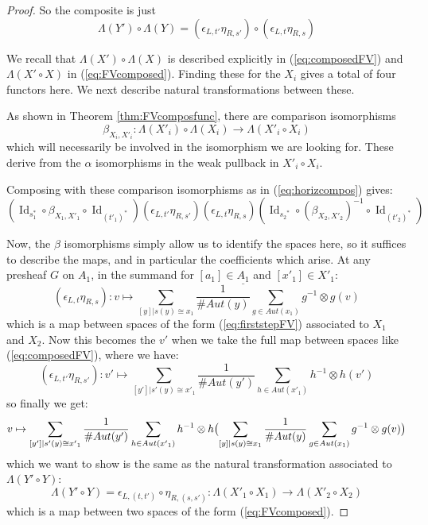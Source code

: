 \documentclass[10pt]{amsart}
\numberwithin{theorem}{subsection}
\newcommand{\ra}{\mathop{\rightarrow}}
\newcommand{\opname}[1]{\operatorname{#1}}
\newcommand{\Id}{\opname{Id}}
\newcommand{\FV}{\Lambda}
\begin{document}
\begin{proof}
So the composite is just
\begin{equation}
\FV(Y') \circ \FV(Y) = (\epsilon_{L,t'} \eta_{R,s'})\circ (\epsilon_{L,t} \eta_{R,s})
\end{equation}

We recall that $\FV(X') \circ \FV(X)$ is described explicitly in
(\ref{eq:composedFV}) and $\FV(X' \circ X)$ in (\ref{eq:FVcomposed}).
Finding these for the $X_i$ gives a total of four functors here.  We
next describe natural transformations between these.

As shown in Theorem \ref{thm:FVcomposfunc}, there are comparison
isomorphisms
\begin{equation}
\beta_{X_i,{X'}_i} : \FV({X'}_i) \circ \FV(X_i) \ra \FV({X'}_i \circ X_i)
\end{equation}
which will necessarily be involved in the isomorphism we are looking
for.  These derive from the $\alpha$ isomorphisms in the weak pullback
in ${X'}_i \circ X_i$.

Composing with these comparison isomorphisms as in
(\ref{eq:horizcompos}) gives:
\begin{equation}
(\Id_{s_1^{\ast}} \circ \beta_{X_1,{X'}_1} \circ \Id_{({t'}_1)^{\ast}}) (\epsilon_{L,t'} \eta_{R,s'})  (\epsilon_{L,t} \eta_{R,s}) (\Id_{{s_2}^{\ast}} \circ (\beta_{X_2,{X'}_2})^{-1} \circ \Id_{({t'}_2)^{\ast}})
\end{equation}

Now, the $\beta$ isomorphisms simply allow us to identify the spaces here, so it suffices to describe the maps, and in particular the coefficients which arise.  At any presheaf $G$ on $A_1$, in the summand for $[a_1] \in \underline{A_1}$ and $[x'_1] \in X'_1$:
\begin{equation}
 (\epsilon_{L,t} \eta_{R,s}) : v \mapsto \sum_{[y] | s(y) \cong x_1} \frac{1}{\# Aut(y)} \sum_{g \in Aut(x_1)} g^{-1} \otimes g(v)
\end{equation}
which is a map between spaces of the form (\ref{eq:firststepFV}) associated to $X_1$ and $X_2$.  Now this becomes the $v'$ when we take the full map between spaces like (\ref{eq:composedFV}), where we have:
\begin{equation}
  (\epsilon_{L,t'} \eta_{R,s'}): v' \mapsto \sum_{[y'] | s'(y) \cong {x'}_1} \frac{1}{\# Aut(y')} \sum_{h \in Aut({x'}_1)} h^{-1} \otimes h(v')
\end{equation}
so finally we get:
\begin{equation}
v \mapsto \sum_{[y'] | s'(y) \cong {x'}_1} \frac{1}{\# Aut(y')} \sum_{h \in Aut({x'}_1)} h^{-1} \otimes h \bigl{(} \sum_{[y] | s(y) \cong x_1} \frac{1}{\# Aut(y)} \sum_{g \in Aut(x_1)} g^{-1} \otimes g(v) \bigr{)}
\end{equation}
which we want to show is the same as the natural transformation
associated to $\FV(Y' \circ Y)$:
\begin{equation}\label{eq:FVhoriz}
\FV(Y' \circ Y) = \epsilon_{L,(t,t')} \circ \eta_{R,(s,s')} : \FV({X'}_1 \circ X_1) \ra \FV({X'}_2 \circ X_2)
\end{equation}
which is a map between two spaces of the form (\ref{eq:FVcomposed}).


\end{proof}
\end{document}
